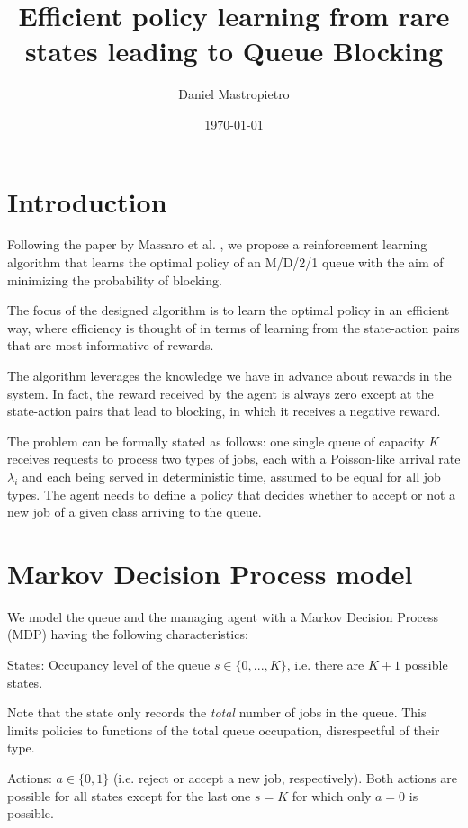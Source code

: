 \documentclass[11pt,A4paper]{article}
\author{Daniel Mastropietro}
\title{Efficient policy learning from rare states leading to Queue Blocking}
\date{\today}
\begin{document}
\maketitle

\section{Introduction}

Following the paper by Massaro et al. \cite{Massaro2019}, we propose a reinforcement learning algorithm that learns the optimal policy of an M/D/2/1 queue with the aim of minimizing the probability of blocking.

The focus of the designed algorithm is to learn the optimal policy in an efficient way, where efficiency is thought of in terms of learning from the state-action pairs that are most informative of rewards.

The algorithm leverages the knowledge we have in advance about rewards in the system. In fact, the reward received by the agent is always zero except at the state-action pairs that lead to blocking, in which it receives a negative reward.

The problem can be formally stated as follows: one single queue of capacity $K$ receives requests to process two types of jobs, each with a Poisson-like arrival rate $\lambda_i$ and each being served in deterministic time, assumed to be equal for all job types. The agent needs to define a policy that decides whether to accept or not a new job of a given class arriving to the queue.



\section{Markov Decision Process model}

We model the queue and the managing agent with a Markov Decision Process (MDP) having the following characteristics:

\medskip
States: Occupancy level of the queue $s \in \{0, ..., K\}$, i.e. there are $K+1$ possible states.

Note that the state only records the \emph{total} number of jobs in the queue. This limits policies to functions of the total queue occupation, disrespectful of their type.

\smallskip
Actions: $a \in \{0, 1\}$ (i.e. reject or accept a new job, respectively). Both actions are possible for all states except for the last one $s = K$ for which only $a = 0$ is possible.
\end{document}
